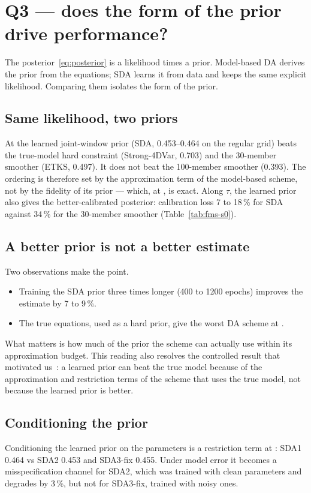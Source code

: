 \section{Q3 --- does the form of the prior drive performance?}\label{sec:q3}

The posterior~\eqref{eq:posterior} is a likelihood times a prior. Model-based DA
derives the prior from the equations; SDA learns it from data and keeps the same
explicit likelihood. Comparing them isolates the form of the prior.

\subsection{Same likelihood, two priors}
At \Sz{} the learned joint-window prior (SDA, 0.453--0.464 on the regular grid)
beats the true-model hard constraint (Strong-4DVar, 0.703) and the 30-member
smoother (ETKS, 0.497). It does not beat the 100-member smoother (0.393). The
ordering is therefore set by the approximation term of the model-based scheme,
not by the fidelity of its prior --- which, at \Sz, is exact. Along $\tau$, the
learned prior also gives the better-calibrated posterior: calibration loss 7 to
18\,\% for SDA against 34\,\% for the 30-member smoother (Table~\ref{tab:fms-s0}).


\subsection{A better prior is not a better estimate}
Two observations make the point.
\begin{itemize}[leftmargin=*]
  \item Training the SDA prior three times longer (400 to 1200 epochs) improves the
    estimate by 7 to 9\,\%.
  \item The true equations, used as a hard prior, give the worst DA scheme at
    \Sz.
\end{itemize}
What matters is how much of the prior the scheme can actually use within its
approximation budget. This reading also resolves the controlled result that
motivated us~\cite{fablet4dvarnet}: a learned prior can beat the true model
because of the approximation and restriction terms of the scheme that uses the
true model, not because the learned prior is better.

\subsection{Conditioning the prior}
Conditioning the learned prior on the parameters is a restriction term at \Sz{}:
SDA1 0.464 vs SDA2 0.453 and SDA3-fix 0.455. Under model error it becomes a
misspecification channel for SDA2, which was trained with clean parameters and
degrades by 3\,\%, but not for SDA3-fix, trained with noisy ones.

